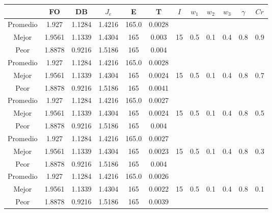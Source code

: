 \begin{table}[h!]
    \footnotesize
    \begin{center}
        \begin{tabular}{|c|c|c|c|c|c|c|c|c|c|c|c|}
        \hline
            & {\bf FO} & {\bf DB} & $J_e$ & {\bf E} & {\bf T} & $I$ & $w_1$ & $w_2$ & $w_3$ & $\gamma$ & $Cr$ \\
        \hline
        \hline
            Promedio  & 1.927 & 1.1284 & 1.4216 & 165.0 & 0.0028 &  &  &  &  &  & \\
            \cline{1-6}
            Mejor & 1.9561 & 1.1339  & 1.4304 & 165 & 0.003 & 15 & 0.5 & 0.1 & 0.4 & 0.8 & 0.9\\
            \cline{1-6}
            Peor & 1.8878 & 0.9216  & 1.5186 & 165 & 0.004 &  &  &  &  &  & \\
        \hline
        \hline
            Promedio  & 1.927 & 1.1284 & 1.4216 & 165.0 & 0.0028 &  &  &  &  &  & \\
            \cline{1-6}
            Mejor & 1.9561 & 1.1339  & 1.4304 & 165 & 0.0024 & 15 & 0.5 & 0.1 & 0.4 & 0.8 & 0.7\\
            \cline{1-6}
            Peor & 1.8878 & 0.9216  & 1.5186 & 165 & 0.0041 &  &  &  &  &  & \\
        \hline
        \hline
            Promedio  & 1.927 & 1.1284 & 1.4216 & 165.0 & 0.0027 &  &  &  &  &  & \\
            \cline{1-6}
            Mejor & 1.9561 & 1.1339  & 1.4304 & 165 & 0.0024 & 15 & 0.5 & 0.1 & 0.4 & 0.8 & 0.5\\
            \cline{1-6}
            Peor & 1.8878 & 0.9216  & 1.5186 & 165 & 0.004 &  &  &  &  &  & \\
        \hline
        \hline
            Promedio  & 1.927 & 1.1284 & 1.4216 & 165.0 & 0.0027 &  &  &  &  &  & \\
            \cline{1-6}
            Mejor & 1.9561 & 1.1339  & 1.4304 & 165 & 0.0023 & 15 & 0.5 & 0.1 & 0.4 & 0.8 & 0.3\\
            \cline{1-6}
            Peor & 1.8878 & 0.9216  & 1.5186 & 165 & 0.004 &  &  &  &  &  & \\
        \hline
        \hline
            Promedio  & 1.927 & 1.1284 & 1.4216 & 165.0 & 0.0026 &  &  &  &  &  & \\
            \cline{1-6}
            Mejor & 1.9561 & 1.1339  & 1.4304 & 165 & 0.0022 & 15 & 0.5 & 0.1 & 0.4 & 0.8 & 0.1\\
            \cline{1-6}
            Peor & 1.8878 & 0.9216  & 1.5186 & 165 & 0.0039 &  &  &  &  &  & \\

\end{tabular}
\end{center}
\end{table}
